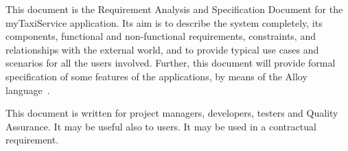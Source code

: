 This document is the  Requirement Analysis and Specification Document for the myTaxiService application.
Its aim is to describe the system completely, its components, functional and non-functional requirements, constraints, and relationships with the external world, and to provide typical use cases and scenarios for all the users involved.
Further, this document will provide formal specification of some features of the applications, by means of the Alloy language~\cite{alloy-site}.

This document is written for project managers, developers, testers and Quality Assurance. It may be useful also to users. It may be used in a contractual requirement.
